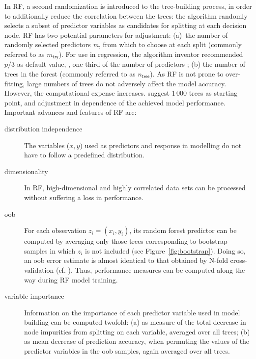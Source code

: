 In \ac{RF}, a second randomization is introduced to the tree-building process, in order to additionally reduce the correlation between the trees: 
the algorithm randomly selects a subset of predictor variables as candidates for splitting at each decision node.
\ac{RF} has two potential parameters for adjustment: 
(a)~the number of randomly selected predictors \emph{m}, from which to choose at each split 
(commonly referred to as $m_{\textsf{try}}$). 
For use in regression, the algorithm inventor \citeauthor{Breiman.2001} recommended $p/3$ as default value, \ie, one third of the 
number of predictors \parencite{Breiman.2001}; (b) the number of trees in the forest (commonly referred to as $n_{\textsf{tree}}$). 
As \ac{RF} is not prone to over-fitting, large numbers of trees do not adversely affect the model accuracy. 
However, the computational expense increases. \textcite{Kuhn.2013b} suggest 1\,000 trees as starting point,
and adjustment in dependence of the achieved model performance.
Important advances and features of \ac{RF} are:

\begin{description}
	\item[distribution independence] The variables ($x, y$) used as predictors and response in modelling do not have to follow a predefined distribution.
	\item[dimensionality] In \ac{RF}, high-dimensional and highly correlated data sets can be processed without suffering a loss in performance.
	\item[\acf{oob}] For each observation $z_i = (x_i, y_i)$, its random forest predictor can be computed by averaging only those trees corresponding to 
		bootstrap samples in which $z_i$ is not included (see Figure~\ref{fig:bootstrap}). 
		Doing so, an \ac{oob} error estimate is almost identical to that obtained by
		N-fold cross-validation (cf. \cite{Hastie.2009}). 
		Thus, performance measures can be computed along the way during \ac{RF} model training.
	\item[variable importance] Information on the importance of each predictor variable used in model building can be computed twofold: 
		(a) as measure of the total decrease in node impurities from splitting on each variable, averaged over all trees; 
		(b) as mean decrease of prediction accuracy, when permuting the values of the predictor variables in the \ac{oob} samples, again averaged over all trees. 
\end{description}



